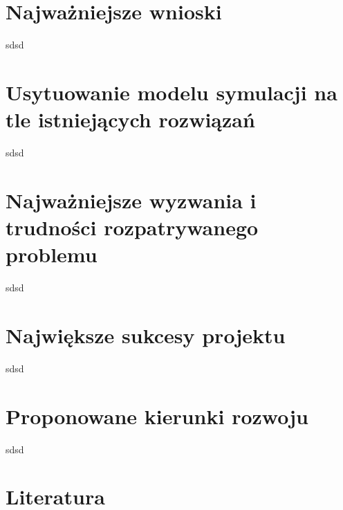 \documentclass[a4paper, 11pt]{article}
\begin{document}
	\section*{Najważniejsze wnioski}
	\indent
	
	sdsd
	\section*{Usytuowanie modelu symulacji na tle istniejących rozwiązań}
	\indent
	
	sdsd
	\section*{Najważniejsze wyzwania i trudności rozpatrywanego problemu}
	\indent
	
	sdsd
	\section*{Największe sukcesy projektu}
	\indent
	
	sdsd
	\section*{Proponowane kierunki rozwoju}
	\indent
	
	sdsd
	\section{Literatura}
	
\end{document}
